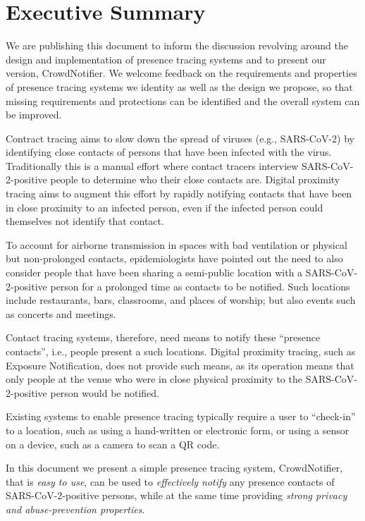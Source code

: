 \section*{Executive Summary}
We are publishing this document to inform the discussion revolving around the design and implementation of presence tracing systems and to present our version, CrowdNotifier. We welcome feedback on the requirements and properties of presence tracing systems we identity as well as the design we propose, so that missing requirements and protections can be identified and the overall system can be improved.

Contract tracing aims to slow down the spread of viruses (e.g., SARS-CoV-2) by identifying close contacts of persons that have been infected with the virus. Traditionally this is a manual effort where contact tracers interview SARS-CoV-2-positive people to determine who their close contacts are. Digital proximity tracing aims to augment this effort by rapidly notifying contacts that have been in close proximity to an infected person, even if the infected person could themselves not identify that contact.

To account for airborne transmission in spaces with bad ventilation or physical but non-prolonged contacts, epidemiologists have pointed out the need to also consider people that have been sharing a semi-public location with a SARS-CoV-2-positive person for a prolonged time as contacts to be notified. Such locations include restaurants, bars, classrooms, and places of worship; but also events such as concerts and meetings. 

Contact tracing systems, therefore, need means to notify these ``presence contacts'', i.e., people present a such locations. Digital proximity tracing, such as Exposure Notification, does not provide such means, as its operation means that only people at the venue who were in close physical proximity to the SARS-CoV-2-positive person would be notified.

Existing systems to enable presence tracing typically require a user to “check-in” to a location, such as using a hand-written or electronic form, or using a sensor on a device, such as a camera to scan a QR code. 

In this document we present a simple presence tracing system, CrowdNotifier,
that is \emph{easy to use}, can be used to \emph{effectively notify} any presence contacts of SARS-CoV-2-positive persons, while at the same time providing \emph{strong privacy and abuse-prevention properties}.